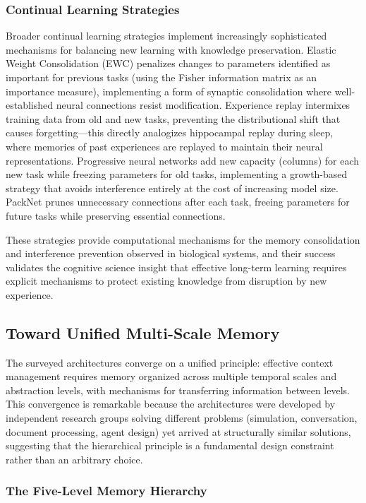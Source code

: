 \documentclass[11pt,letterpaper]{article}
\begin{document}
\subsubsection{Continual Learning Strategies}

Broader continual learning strategies implement increasingly sophisticated mechanisms for balancing new learning with knowledge preservation. Elastic Weight Consolidation (EWC) penalizes changes to parameters identified as important for previous tasks (using the Fisher information matrix as an importance measure), implementing a form of synaptic consolidation where well-established neural connections resist modification. Experience replay intermixes training data from old and new tasks, preventing the distributional shift that causes forgetting---this directly analogizes hippocampal replay during sleep, where memories of past experiences are replayed to maintain their neural representations. Progressive neural networks add new capacity (columns) for each new task while freezing parameters for old tasks, implementing a growth-based strategy that avoids interference entirely at the cost of increasing model size. PackNet prunes unnecessary connections after each task, freeing parameters for future tasks while preserving essential connections.

These strategies provide computational mechanisms for the memory consolidation and interference prevention observed in biological systems, and their success validates the cognitive science insight that effective long-term learning requires explicit mechanisms to protect existing knowledge from disruption by new experience.

\subsection{Toward Unified Multi-Scale Memory}

The surveyed architectures converge on a unified principle: effective context management requires memory organized across multiple temporal scales and abstraction levels, with mechanisms for transferring information between levels. This convergence is remarkable because the architectures were developed by independent research groups solving different problems (simulation, conversation, document processing, agent design) yet arrived at structurally similar solutions, suggesting that the hierarchical principle is a fundamental design constraint rather than an arbitrary choice.

\subsubsection{The Five-Level Memory Hierarchy}
\end{document}
